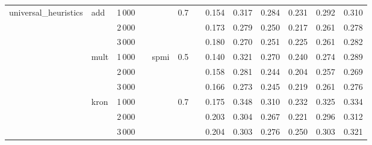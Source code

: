 \begin{tabular}{lllllllrrrrrr}
universal\_heuristics & add & 1\,000 &   &      & 0.7 &   &        0.154 &         0.317 &           0.284 &            0.231 &             0.292 &       0.310 \\
       & {} & 2\,000 &   &      &     &   &        0.173 &         0.279 &           0.250 &            0.217 &             0.261 &       0.278 \\
       & {} & 3\,000 &   &      &     &   &        0.180 &         0.270 &           0.251 &            0.225 &             0.261 &       0.282 \\
       & mult & 1\,000 &   & spmi & 0.5 &   &        0.140 &         0.321 &           0.270 &            0.240 &             0.274 &       0.289 \\
       & {} & 2\,000 &   &      &     &   &        0.158 &         0.281 &           0.244 &            0.204 &             0.257 &       0.269 \\
       & {} & 3\,000 &   &      &     &   &        0.166 &         0.273 &           0.245 &            0.219 &             0.261 &       0.276 \\
       & kron & 1\,000 &   &      & 0.7 &   &        0.175 &         0.348 &           0.310 &            0.232 &             0.325 &       0.334 \\
       & {} & 2\,000 &   &      &     &   &        0.203 &         0.304 &           0.267 &            0.221 &             0.296 &       0.312 \\
       & {} & 3\,000 &   &      &     &   &        0.204 &         0.303 &           0.276 &            0.250 &             0.303 &       0.321 \\
\bottomrule
\end{tabular}
